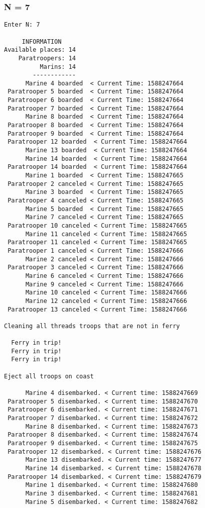 \documentclass{article}
\begin{document}
\subsubsection*{N = 7}
\begin{lstlisting}[]
Enter N: 7

     INFORMATION
Available places: 14
    Paratroopers: 14
          Marins: 14
        ------------
      Marine 4 boarded  < Current Time: 1588247664 
 Paratrooper 5 boarded  < Current Time: 1588247664 
 Paratrooper 6 boarded  < Current Time: 1588247664 
 Paratrooper 7 boarded  < Current Time: 1588247664 
      Marine 8 boarded  < Current Time: 1588247664 
 Paratrooper 8 boarded  < Current Time: 1588247664 
 Paratrooper 9 boarded  < Current Time: 1588247664 
 Paratrooper 12 boarded  < Current Time: 1588247664 
      Marine 13 boarded  < Current Time: 1588247664 
      Marine 14 boarded  < Current Time: 1588247664 
 Paratrooper 14 boarded  < Current Time: 1588247664 
      Marine 1 boarded  < Current Time: 1588247665 
 Paratrooper 2 canceled < Current Time: 1588247665 
      Marine 3 boarded  < Current Time: 1588247665 
 Paratrooper 4 canceled < Current Time: 1588247665 
      Marine 5 boarded  < Current Time: 1588247665 
      Marine 7 canceled < Current Time: 1588247665 
 Paratrooper 10 canceled < Current Time: 1588247665 
      Marine 11 canceled < Current Time: 1588247665 
 Paratrooper 11 canceled < Current Time: 1588247665 
 Paratrooper 1 canceled < Current Time: 1588247666 
      Marine 2 canceled < Current Time: 1588247666 
 Paratrooper 3 canceled < Current Time: 1588247666 
      Marine 6 canceled < Current Time: 1588247666 
      Marine 9 canceled < Current Time: 1588247666 
      Marine 10 canceled < Current Time: 1588247666 
      Marine 12 canceled < Current Time: 1588247666 
 Paratrooper 13 canceled < Current Time: 1588247666 

Cleaning all threads troops that are not in ferry

  Ferry in trip!
  Ferry in trip!
  Ferry in trip!

Eject all troops on coast

      Marine 4 disembarked. < Current time: 1588247669
 Paratrooper 5 disembarked. < Current time: 1588247670
 Paratrooper 6 disembarked. < Current time: 1588247671
 Paratrooper 7 disembarked. < Current time: 1588247672
      Marine 8 disembarked. < Current time: 1588247673
 Paratrooper 8 disembarked. < Current time: 1588247674
 Paratrooper 9 disembarked. < Current time: 1588247675
 Paratrooper 12 disembarked. < Current time: 1588247676
      Marine 13 disembarked. < Current time: 1588247677
      Marine 14 disembarked. < Current time: 1588247678
 Paratrooper 14 disembarked. < Current time: 1588247679
      Marine 1 disembarked. < Current time: 1588247680
      Marine 3 disembarked. < Current time: 1588247681
      Marine 5 disembarked. < Current time: 1588247682
\end{lstlisting}
\newpage
\end{document}
